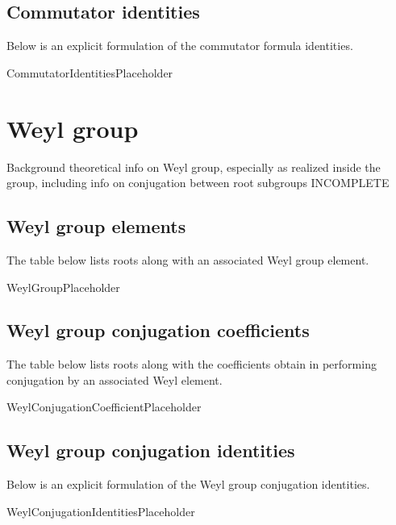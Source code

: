 \documentclass[11pt]{article}
\newcommand{\noi}{\noindent}
\theoremstyle{definition}
\begin{document}
\subsection{Commutator identities}

\noi Below is an explicit formulation of the commutator formula identities.

CommutatorIdentitiesPlaceholder

\newpage
\section{Weyl group}

\noi Background theoretical info on Weyl group, especially as realized inside the group, including info on conjugation between root subgroups INCOMPLETE

\subsection{Weyl group elements}

\noi The table below lists roots along with an associated Weyl group element.

WeylGroupPlaceholder

\subsection{Weyl group conjugation coefficients}

\noi The table below lists roots along with the coefficients obtain in performing conjugation by an associated Weyl element.

WeylConjugationCoefficientPlaceholder

\subsection{Weyl group conjugation identities}

\noi Below is an explicit formulation of the Weyl group conjugation identities.

WeylConjugationIdentitiesPlaceholder
\end{document}
